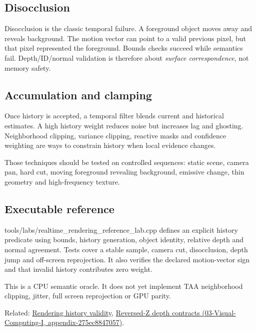 \subsection{Disocclusion}\label{appendix-e8c352e39466-disocclusion}

Disocclusion is the classic temporal failure. A foreground object moves away and reveals background. The motion vector can point to a valid previous pixel, but that pixel represented the foreground. Bounds checks succeed while semantics fail. Depth/ID/normal validation is therefore about \emph{surface correspondence}, not memory safety.

\subsection{Accumulation and clamping}\label{appendix-e8c352e39466-accumulation-and-clamping}

Once history is accepted, a temporal filter blends current and historical estimates. A high history weight reduces noise but increases lag and ghosting. Neighborhood clipping, variance clipping, reactive masks and confidence weighting are ways to constrain history when local evidence changes.

Those techniques should be tested on controlled sequences: static scene, camera pan, hard cut, moving foreground revealing background, emissive change, thin geometry and high-frequency texture.

\subsection{Executable reference}\label{appendix-e8c352e39466-executable-reference}

tools/labs/realtime\_rendering\_reference\_lab.cpp defines an explicit history predicate using bounds, history generation, object identity, relative depth and normal agreement. Tests cover a stable sample, camera cut, disocclusion, depth jump and off-screen reprojection. It also verifies the declared motion-vector sign and that invalid history contributes zero weight.

This is a CPU semantic oracle. It does not yet implement TAA neighborhood clipping, jitter, full screen reprojection or GPU parity.

Related: \hyperref[appendix-2e7e9fd28a2c]{Rendering history validity}, \href{../03-Visual-Computing-I/main.pdf\#nameddest=appendix-275ec8847057}{Reversed-Z depth contracts (03-Visual-Computing-I, appendix-275ec8847057)}.
